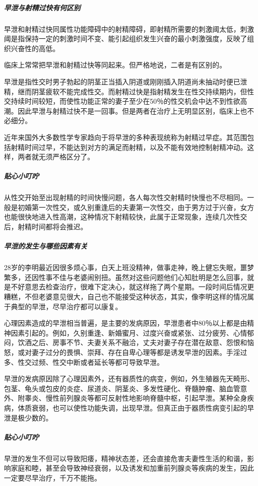 \begin{enumerate}
\subparagraph{早泄与射精过快有何区别}

早泄和射精过快同属性功能障碍中的射精障碍，即射精所需要的刺激阈太低，刺激阈是指保持一定的刺激时间不变、能引起组织发生兴奋的最小刺激强度，反映了组织兴奋性的高低。

临床上常常把早泄和射精过快等同起来。但严格地说，二者是有区别的。

早泄是指性交时男子勃起的阴茎正当插入阴道或刚刚插入阴道尚未抽动时便已泄精，继而阴茎疲软不能完成性交。而射精过快是指射精发生在性交持续期内，但性交持续时间较短，而使性功能正常的妻子至少在50％的性交机会中达不到性欲高潮。因此早泄与射精过快不是一回事。但是两者在治疗上无明显区别，临床上也不必细分。

近年来国外大多数性学专家趋向于将早泄的多种表现统称为射精过早症。其范围包括射精时间过早，不能达到对方的满足而射精，以及不能有效地控制射精冲动。这样，两者就无须严格区分了。

\subparagraph{贴心小叮咛}

从性交开始至出现射精的时间快慢问题，各人每次性交射精时快慢也不尽相同。一般是初婚第一次性交，或久别重逢后的夫妻第一次性交，由于男方过于兴奋，女方也能很快地进入性高潮，这种情况下射精较快，此属于正常现象，连续几次性交后，射精时间都将会推迟。

\subparagraph{早泄的发生与哪些因素有关}

28岁的李明最近因很多烦心事，白天上班没精神，做事走神，晚上健忘失眠，噩梦繁多，还因性事不佳与老婆闹别扭。虽然对这些问题他们心知肚明是怎么回事，就是不好意思去检查治疗，很难下定决心，就这样拖了两个星期。一段时间后情况更糟糕，不但老婆意见很大，自己也不能接受这种状态，其实，像李明这样的情况属于典型的早泄，尽早治疗都可以康复。

心理因素造成的早泄相当普遍，是主要的发病原因，早泄患者中80％以上都是由精神因素引起的。例如，久别重逢、新婚蜜月、过度兴奋或紧张、过分疲劳、心情郁闷，饮酒之后、房事不节、夫妻关系不融洽，丈夫对妻子存在潜在敌意、怨恨和恼怒，或对妻子过分的畏惧、崇拜、存在自卑心理等都是诱发早泄的因素。手淫过多、性交过频、性交中断或者延长等都可导致早泄。

早泄的发病原因除了心理因素外，还有器质性的病变，例如，外生殖器先天畸形、包茎、龟头或包皮的炎症、尿道炎、阴茎炎、多发性硬化、脊髓肿瘤、脑血管意外、附睾炎、慢性前列腺炎等都可反射性地影响脊髓中枢，引起早泄。某种全身疾病，体质衰弱，也可以使性功能失调，出现早泄。但真正由于器质性病变引起的早泄是极少数的。

\subparagraph{贴心小叮咛}

早泄的发生不但可以导致阳痿，精神状态差，还会直接危害夫妻性生活的和谐，影响家庭和睦，甚至会导致神经衰弱，以及诱发和加重前列腺炎等疾病的发生，因此一定要尽早治疗，千万不能拖。


\end{enumerate}
